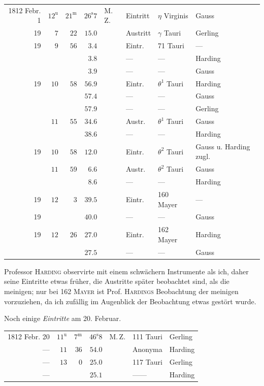 \begin{center}\fontsize{9}{11}\selectfont\setlength{\tabcolsep}{1.8pt}\renewcommand{\arraystretch}{1.15}\begin{tabular}{rrrrllll}
1812 Febr. 1 & $12^{\mathrm u}$ & $21^{\mathrm m}$ & $26^{\mathrm s}7$ & M.\,Z. & Eintritt & $\eta$ Virginis & Gauss\\
19 & $7$ & $22$ & $15.0$ &  & Austritt & $\gamma$ Tauri & Gerling\\
19 & $9$ & $56$ & $3.4$ &  & Eintr. & 71 Tauri & —\\
 &  &  & $3.8$ &  & — & — & Harding\\
 &  &  & $3.9$ &  & — & — & Gauss\\
19 & $10$ & $58$ & $56.9$ &  & Eintr. & $\theta^1$ Tauri & Harding\\
 &  &  & $57.4$ &  & — & — & Gauss\\
 &  &  & $57.9$ &  & — & — & Gerling\\
 & $11$ & $55$ & $34.6$ &  & Austr. & $\theta^1$ Tauri & Gauss\\
 &  &  & $38.6$ &  & — & — & Harding\\
19 & $10$ & $58$ & $12.0$ &  & Eintr. & $\theta^2$ Tauri & Gauss u. Harding zugl.\\
 & $11$ & $59$ & $6.6$ &  & Austr. & $\theta^2$ Tauri & Gauss\\
 &  &  & $8.6$ &  & — & — & Harding\\
19 & $12$ & $3$ & $39.5$ &  & Eintr. & 160 Mayer & —\\
19 &  &  & $40.0$ &  & — & — & Gauss\\
19 & $12$ & $26$ & $27.0$ &  & Eintr. & 162 Mayer & Harding\\
 &  &  & $27.5$ &  & — & — & Gauss\\
\end{tabular}\end{center}

\par\indent Professor \textsc{Harding} observirte mit einem schwächern Instrumente als ich, daher seine Eintritte etwas früher, die Austritte später beobachtet sind, als die meinigen; nur bei 162 \textsc{Mayer} ist Prof. \textsc{Hardings} Beobachtung der meinigen vorzuziehen, da ich zufällig im Augenblick der Beobachtung etwas gestört wurde.
\par\indent Noch einige \emph{Eintritte} am 20. Februar.

\begin{center}\fontsize{10}{12}\selectfont\setlength{\tabcolsep}{3pt}\renewcommand{\arraystretch}{1.15}\begin{tabular}{rrrrlll}
1812 Febr. 20 & $11^{\mathrm u}$ & $7^{\mathrm m}$ & $46^{\mathrm s}8$ & M.\,Z. & 111 Tauri & Gerling\\
— & $11$ & $36$ & $54.0$ &  & Anonyma & Harding\\
— & $13$ & $0$ & $25.0$ &  & 117 Tauri & Gerling\\
— &  &  & $25.1$ &  & —\quad — & Harding\\
\end{tabular}\end{center}
